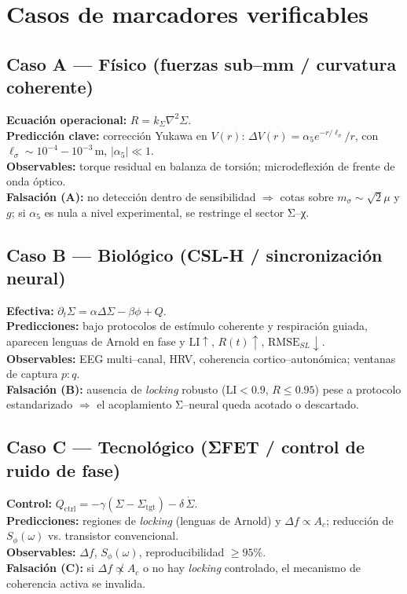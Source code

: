 \documentclass[12pt,a4paper]{article}
\begin{document}
\section{Casos de marcadores verificables}
\subsection{Caso A — Físico (fuerzas sub–mm / curvatura coherente)}
\textbf{Ecuación operacional:} \(R=k_\Sigma\nabla^2\Sigma\). \\
\textbf{Predicción clave:} corrección Yukawa en \(V(r)\): \(\Delta V(r)=\alpha_5 e^{-r/\ell_\sigma}/r\), con \(\ell_\sigma\sim10^{-4}\!-\!10^{-3}\,\mathrm{m}\), \(|\alpha_5|\ll 1\). \\
\textbf{Observables:} torque residual en balanza de torsión; microdeflexión de frente de onda óptico. \\
\textbf{Falsación (A):} no detección dentro de sensibilidad \(\Rightarrow\) cotas sobre \(m_\sigma\sim\sqrt{2}\mu\) y \(g\); si \(\alpha_5\) es nula a nivel experimental, se restringe el sector Σ–χ.

\subsection{Caso B — Biológico (CSL-H / sincronización neural)}
\textbf{Efectiva:} \(\partial_t\Sigma=\alpha\Delta\Sigma-\beta\phi+Q\). \\
\textbf{Predicciones:} bajo protocolos de estímulo coherente y respiración guiada, aparecen lenguas de Arnold en fase y \(\mathrm{LI}\uparrow\), \(R(t)\uparrow\), \(\mathrm{RMSE}_{\!SL}\downarrow\). \\
\textbf{Observables:} EEG multi–canal, HRV, coherencia cortico–autonómica; ventanas de captura \(p\!:\!q\). \\
\textbf{Falsación (B):} ausencia de \emph{locking} robusto (\(\mathrm{LI}<0.9\), \(R\le 0.95\)) pese a protocolo estandarizado \(\Rightarrow\) el acoplamiento Σ–neural queda acotado o descartado.

\subsection{Caso C — Tecnológico (ΣFET / control de ruido de fase)}
\textbf{Control:} \(Q_{\!\mathrm{ctrl}}=-\gamma(\Sigma-\Sigma_{\mathrm{tgt}})-\delta\,\dot\Sigma\). \\
\textbf{Predicciones:} regiones de \emph{locking} (lenguas de Arnold) y \(\Delta f\propto A_c\); reducción de \(S_\phi(\omega)\) vs. transistor convencional. \\
\textbf{Observables:} \(\Delta f\), \(S_\phi(\omega)\), reproducibilidad \(\ge 95\%\). \\
\textbf{Falsación (C):} si \(\Delta f\not\propto A_c\) o no hay \emph{locking} controlado, el mecanismo de coherencia activa se invalida.
\end{document}
